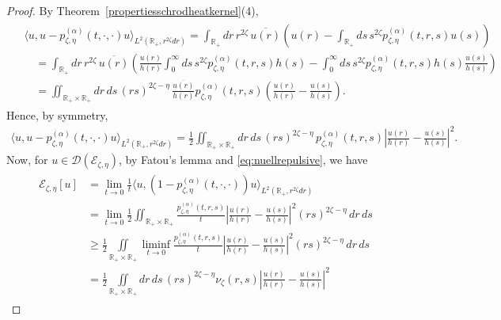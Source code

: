 \documentclass[12pt,reqno]{amsart}
\theoremstyle{definition}
\theoremstyle{remark}
\numberwithin{equation}{section}
\newcommand{\1}{\mathbbm{1}}
\newcommand{\D}{\mathcal{D}}
\newcommand{\R}{\mathbb{R}}
\def\ce{\mathcal{E}}
\begin{document}
\begin{proof}
  By Theorem~\ref{propertiesschrodheatkernel}(4),
  \begin{align}
    \begin{split}
      & \langle u,u-p_{\zeta,\eta}^{(\alpha)}(t,\cdot,\cdot)u\rangle_{L^2(\R_+,r^{2\zeta}dr)}
      = \int_{\R_+}dr\, r^{2\zeta}\, \overline{u(r)}\left(u(r) - \int_{\R_+}ds\, s^{2\zeta} p_{\zeta,\eta}^{(\alpha)}(t,r,s) u(s)\right) \\
      & \quad = \int_{\R_+}dr\, r^{2\zeta}\, \overline{u(r)}\left(\frac{u(r)}{h(r)} \int_0^\infty ds\, s^{2\zeta} p_{\zeta,\eta}^{(\alpha)}(t,r,s)h(s) - \int_0^\infty ds\, s^{2\zeta} p_{\zeta,\eta}^{(\alpha)}(t,r,s)h(s)\frac{u(s)}{h(s)}\right) \\
      & \quad = \iint_{\R_+\times\R_+}dr\,ds\, (rs)^{2\zeta-\eta}\, \frac{\overline{u(r)}}{h(r)} p_{\zeta,\eta}^{(\alpha)}(t,r,s)\left(\frac{u(r)}{h(r)} - \frac{u(s)}{h(s)}\right).
    \end{split}
  \end{align}
  Hence, by symmetry,
  \begin{align}
    \langle u,u-p_{\zeta,\eta}^{(\alpha)}(t,\cdot,\cdot)u\rangle_{L^2(\R_+,r^{2\zeta}dr)}
    = \frac12 \iint_{\R_+\times\R_+}dr\,ds\, (rs)^{2\zeta-\eta}\, p_{\zeta,\eta}^{(\alpha)}(t,r,s)\left|\frac{u(r)}{h(r)} - \frac{u(s)}{h(s)}\right|^2.
  \end{align}
  Now, for $u\in\D(\ce_{\zeta,\eta})$, by Fatou's lemma and \eqref{eq:nuellrepulsive}, we have
  \begin{align}
    \begin{split}
      \ce_{\zeta,\eta}[u]
      & = \lim_{t\to0}\frac1t\langle u,(1-p_{\zeta,\eta}^{(\alpha)}(t,\cdot,\cdot))u\rangle_{L^2(\R_+,r^{2\zeta}dr)} \\
      & = \lim_{t\to0}\frac12\iint_{\R_+\times\R_+}\frac{p_{\zeta,\eta}^{(\alpha)}(t,r,s)}{t} \left|\frac{u(r)}{h(r)} - \frac{u(s)}{h(s)}\right|^2 (rs)^{2\zeta-\eta}\,dr\,ds \\
      & \geq \frac12\iint\limits_{\R_+\times\R_+}\liminf_{t\to0}\frac{p_{\zeta,\eta}^{(\alpha)}(t,r,s)}{t} \left|\frac{u(r)}{h(r)} - \frac{u(s)}{h(s)}\right|^2 (rs)^{2\zeta-\eta}\,dr\,ds \\
      & = \frac12\iint\limits_{\R_+\times\R_+}dr\,ds\, (rs)^{2\zeta-\eta}\nu_\zeta(r,s) \left|\frac{u(r)}{h(r)} - \frac{u(s)}{h(s)}\right|^2

\end{split}
\end{align}
\end{proof}
\end{document}
